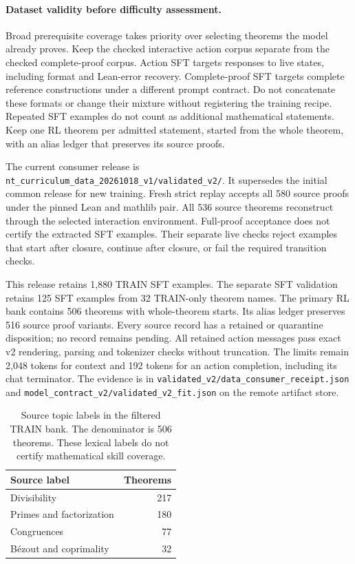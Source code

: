 \documentclass[11pt]{article}
\newcommand{\pth}[1]{\nolinkurl{#1}}
\begin{document}
\paragraph{Dataset validity before difficulty assessment.}
Broad prerequisite coverage takes priority over selecting theorems the model already proves.
Keep the checked interactive action corpus separate from the checked complete-proof corpus.
Action SFT targets responses to live states, including format and Lean-error recovery.
Complete-proof SFT targets complete reference constructions under a different prompt contract.
Do not concatenate these formats or change their mixture without registering the training recipe.
Repeated SFT examples do not count as additional mathematical statements.
Keep one RL theorem per admitted statement, started from the whole theorem, with an alias ledger that preserves its source proofs.

The current consumer release is \pth{nt_curriculum_data_20261018_v1/validated_v2/}.
It supersedes the initial common release for new training.
Fresh strict replay accepts all 580 source proofs under the pinned Lean and mathlib pair.
All 536 source theorems reconstruct through the selected interaction environment.
Full-proof acceptance does not certify the extracted SFT examples.
Their separate live checks reject examples that start after closure, continue after closure, or fail the required transition checks.

This release retains 1,880 TRAIN SFT examples.
The separate SFT validation retains 125 SFT examples from 32 TRAIN-only theorem names.
The primary RL bank contains 506 theorems with whole-theorem starts.
Its alias ledger preserves 516 source proof variants.
Every source record has a retained or quarantine disposition; no record remains pending.
All retained action messages pass exact v2 rendering, parsing and tokenizer checks without truncation.
The limits remain 2,048 tokens for context and 192 tokens for an action completion, including its chat terminator.
The evidence is in \pth{validated_v2/data_consumer_receipt.json} and \pth{model_contract_v2/validated_v2_fit.json} on the remote artifact store.

\begin{table}[ht]
\centering
\caption{Source topic labels in the filtered TRAIN bank. The denominator is 506 theorems. These lexical labels do not certify mathematical skill coverage.}
\label{tab:nt-common-source-coverage}
\begin{tabular}{lr}
\toprule
Source label & Theorems \\
\midrule
Divisibility & 217 \\
Primes and factorization & 180 \\
Congruences & 77 \\
B\'ezout and coprimality & 32 \\
\bottomrule
\end{tabular}
\end{table}
\end{document}
